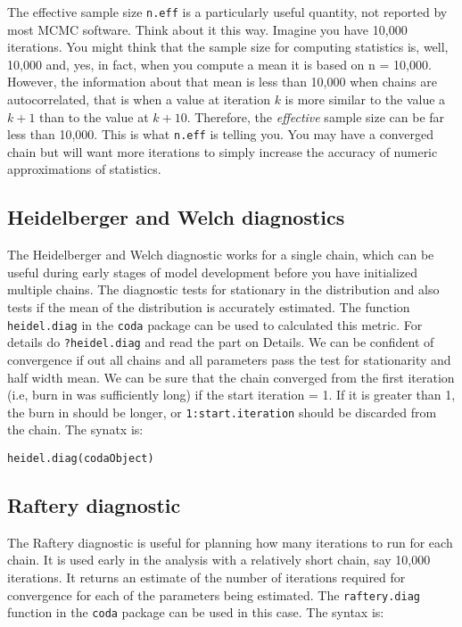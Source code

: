 \documentclass[12pt,english]{article}
\begin{document}
The effective sample size \texttt{n.eff} is a particularly useful quantity, not reported by most MCMC software.  Think about it this way.  Imagine you have 10,000 iterations.  You might think that the sample size for computing statistics is, well, 10,000 and, yes, in fact, when you compute a mean it is based on n = 10,000.  However, the information about that mean is less than 10,000 when chains are autocorrelated, that is when a value at iteration $k$ is more similar to the value a $k+1$ than to the value at $k+10$.  Therefore, the \emph{effective} sample size can be far less than 10,000.  This is what \texttt{n.eff} is telling you.  You may have a converged chain but will want more iterations to simply increase the accuracy of numeric approximations of statistics.

\subsection{Heidelberger and Welch diagnostics}

The Heidelberger and Welch diagnostic \citep{Heidelberger_and_Welch} works for a single chain, which can be useful during early stages of model development before you have initialized multiple chains. The diagnostic tests for stationary in the distribution and also tests if the mean of the distribution is accurately estimated. The function \texttt{heidel.diag} in the \texttt{coda} package can be used to calculated this metric. For details do \texttt{?heidel.diag} and read the part on Details. We can be confident of convergence if out all chains and all parameters pass the test for stationarity and half width mean. We can be sure that the chain converged from the first iteration (i.e, burn in was sufficiently long) if the start iteration = 1. If it is greater than 1, the burn in should be longer, or \texttt{1:start.iteration} should be discarded from the chain. The synatx is:

\begin{Verbatim}
heidel.diag(codaObject)
\end{Verbatim}

\subsection{Raftery diagnostic}

The Raftery diagnostic \citet{Raftery_et_al1995} is useful for planning how many iterations to run for each chain. It is used early in the analysis with a relatively short chain, say 10,000 iterations. It returns an estimate of the number of iterations required for convergence for each of the parameters being estimated. The \texttt{raftery.diag} function in the \texttt{coda} package can be used in this case. The syntax is:
\end{document}
